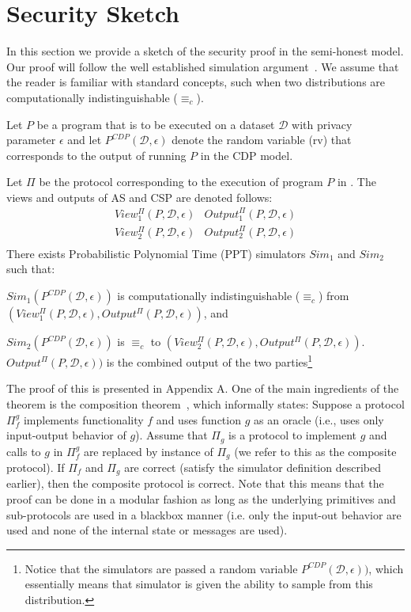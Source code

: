 \section{\system Security Sketch}



In this section we provide a sketch of the security proof in the
semi-honest model.  Our proof will follow the well established
simulation argument~\cite[Chapter 7]{Oded}. We assume that the reader
is familiar with standard concepts, such when two distributions are
computationally indistinguishable ($\equiv_c$).

Let $P$ be a program that is to be executed on a dataset $\mathcal{D}$
with privacy parameter $\epsilon$ and let
$P^{CDP}(\mathcal{D},\epsilon)$ denote the random variable (rv) that
corresponds to the output of running $P$ in the \textsf{CDP} model.

\begin{theorem}\label{thm:security}
\rm
Let $\Pi$ be the protocol corresponding to the execution of program $P$ in \system. The
views and outputs of \textsf{AS} and \textsf{CSP} are denoted follows:
\[
\begin{array}{cc}
View_1^{\Pi}(P,\mathcal{D},\epsilon) & Output_1^{\Pi}(P,\mathcal{D},\epsilon) \\
View_2^{\Pi}(P,\mathcal{D},\epsilon) & Output_2^{\Pi}(P,\mathcal{D},\epsilon) \\
\end{array}
\]
There exists Probabilistic Polynomial Time (PPT) simulators $Sim_1$
and $Sim_2$ such that:
\squishlist
\item $Sim_1 (P^{CDP}(\mathcal{D},\epsilon))$ is computationally indistinguishable ($\equiv_c$)
from $(View_1^{\Pi}(P,\mathcal{D},\epsilon),Output^{\Pi}(P,\mathcal{D},\epsilon))$, and
\item $Sim_2 (P^{CDP}(\mathcal{D},\epsilon))$ is $\equiv_c$ to
  $(View_2^{\Pi}(P,\mathcal{D},\epsilon),Output^{\Pi}(P,\mathcal{D},\epsilon))$.
  \squishend $Output^{\Pi}(P,\mathcal{D},\epsilon))$ is the combined
  output of the two parties\footnote{Notice that the simulators are
    passed a random variable $P^{CDP}(\mathcal{D},\epsilon))$, which
    essentially means that simulator is given the ability to sample
    from this distribution.}
\end{theorem}
The proof of this is presented in Appendix A. One of the main
ingredients of the theorem is the composition theorem~\cite[Section
  7.3.1]{Oded}, which informally states: Suppose a protocol $\Pi_f^g$
implements functionality $f$ and uses function $g$ as an oracle (i.e.,
uses only input-output behavior of $g$).  Assume that $\Pi_g$ is a
protocol to implement $g$ and calls to $g$ in $\Pi_f^g$ are replaced
by instance of $\Pi_g$ (we refer to this as the composite
protocol). If $\Pi_f$ and $\Pi_g$ are correct (satisfy the simulator
definition described earlier), then the composite protocol is
correct. Note that this means that the proof can be done in a modular
fashion as long as the underlying primitives and sub-protocols are
used in a blackbox manner (i.e. only the input-out behavior are used
and none of the internal state or messages are used).

